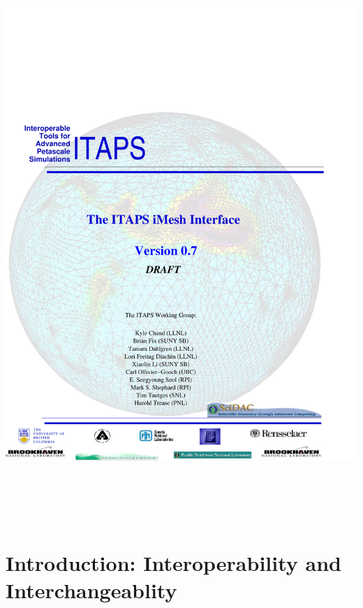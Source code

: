 \documentclass{article}
\begin{document}
\vspace{-5in}
\hspace{-1in}
\vspace{-5in}
\includegraphics[height=8.5in, width=7.3in]{figures/iMesh.pdf}

\newpage
\tableofcontents
\newpage

\section{Introduction: Interoperability and Interchangeablity}
\end{document}
